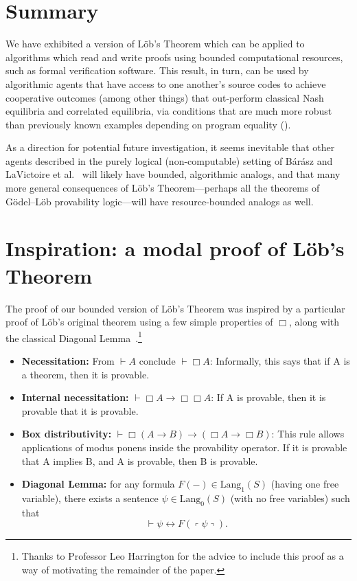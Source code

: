 \documentclass[onecolumn]{miri-tech-article}
\numberwithin{equation}{section}
\theoremstyle{definition}
\newcommand{\proves}[1]{\underset{#1}{\vdash}}
\newcommand{\Lang}{\mathrm{Lang}}
\renewcommand{\iff}{\leftrightarrow}
\newcommand{\qquote}[1]{\left\ulcorner #1 \right\urcorner}
\renewcommand{\-}{^{-1}}
\begin{document}
\section{Summary}
We have exhibited a version of L\"{o}b's Theorem which can be applied to algorithms which read and write proofs using bounded computational resources, such as formal verification software.  This result, in turn, can be used by algorithmic agents that have access to one another's source codes to achieve cooperative outcomes (among other things) that out-perform classical Nash equilibria and correlated equilibria, via conditions that are much more robust than previously known examples depending on program equality (\cite{Tennenholtz:2004:Program}).

As a direction for potential future investigation, it seems inevitable that other agents described in the purely logical (non-computable) setting of  B\'{a}r\'{a}sz and LaVictoire et al.~\cite{Barasz:2014:RobustCooperation}\cite{LaVictoire:2014:PrisDilemmaLob} will likely have bounded, algorithmic analogs, and that many more general consequences of L\"{o}b's Theorem---perhaps all the theorems of G\"{o}del--L\"{o}b provability logic---will have resource-bounded analogs as well.

\appendix

\section{Inspiration: a modal proof of L\"{o}b's Theorem}

The proof of our bounded version of L\"{o}b's Theorem was inspired by a particular proof of L\"{o}b's original theorem using a few simple properties of $\Box$, along with the classical Diagonal Lemma~\cite{Carnap:1934}.\footnote{Thanks to Professor Leo Harrington for the advice to include this proof as a way of motivating the remainder of the paper.}

\begin{itemize}
\item {\bf Necessitation:} From $\vdash A$ conclude $\vdash \Box A$: Informally, this says that if A is a theorem, then it is provable.
\item {\bf Internal necessitation:} $\vdash \Box A \rightarrow \Box \Box A$: If A is provable, then it is provable that it is provable.
\item {\bf Box distributivity:} $\vdash \Box (A \rightarrow B) \rightarrow (\Box A \rightarrow \Box B)$:  This rule allows applications of modus ponens inside the provability operator. If it is provable that A implies B, and A is provable, then B is provable.
\item {\bf Diagonal Lemma:} for any formula $F(-)\in\Lang_1(S)$ (having one free variable), there exists a sentence $\psi\in\Lang_0(S)$ (with no free variables) such that $$\proves{} \psi \iff F(\qquote\psi).$$  
\end{itemize}
\end{document}
